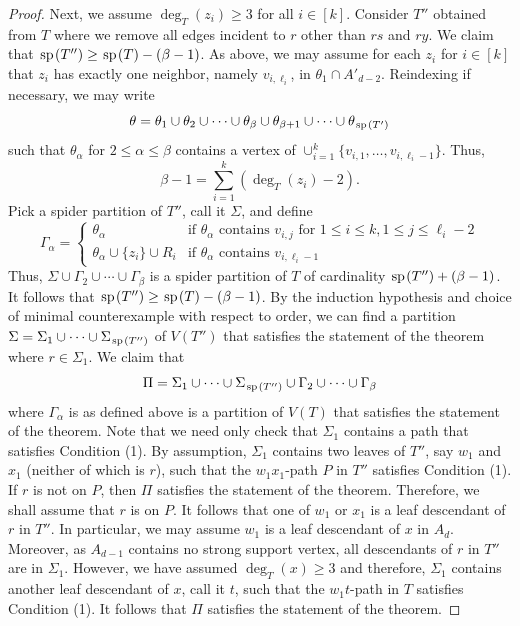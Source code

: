 \documentclass[11pt]{article}
\newcommand{\spider}{\hskip1pt \textrm{sp} \hskip1pt}
\begin{document}
\begin{proof}
Next, we assume $\deg_T(z_i) \ge 3$ for all $i \in [k]$. Consider $T''$ obtained from $T$ where we remove all edges incident to $r$ other than $rs$ and $ry$. We claim that $\spider(T'') \ge \spider(T) - (\beta -1)$. As above, we may assume for each $z_i$ for $i \in [k]$ that $z_i$ has exactly one neighbor, namely $v_{i, \ell_i}$, in $\theta_1 \cap A'_{d-2}$. Reindexing if necessary, we may write 
\[\theta = \theta_1 \cup \theta_2 \cup \cdots \cup \theta_{\beta} \cup \theta_{\beta+1} \cup \cdots \cup \theta_{\spider(T')}\]
such that $\theta_{\alpha}$ for $2 \le \alpha \le \beta$ contains a vertex of $\cup_{i=1}^k \{v_{i,1}, \dots, v_{i,\ell_i-1}\}$. Thus, 
\[\beta-1 = \sum_{i=1}^k (\deg_T(z_i) - 2).\]
Pick a spider partition of $T''$, call it $\Sigma$, and define 
\[\Gamma_{\alpha} = \begin{cases} 
\theta_{\alpha} & \text{if $\theta_{\alpha}$ contains $v_{i,j}$ for $1 \le i \le k, 1\le j \le \ell_i-2$}\\
\theta_{\alpha} \cup \{z_i\} \cup R_{i} & \text{if $\theta_{\alpha}$ contains $v_{i, \ell_i-1}$}
\end{cases}\]
Thus, $\Sigma \cup \Gamma_2 \cup \cdots \cup \Gamma_{\beta}$ is a spider partition of $T$ of cardinality $\spider(T'') + (\beta-1)$. It follows that $\spider(T'') \ge \spider(T) - (\beta-1)$. By the induction hypothesis and choice of minimal counterexample with respect to order, we can find a partition $\Sigma = \Sigma_1 \cup \cdots \cup \Sigma_{\spider(T'')}$ of $V(T'')$ that satisfies the statement of the theorem where $r \in \Sigma_1$. We claim that 
\[\Pi = \Sigma_1\cup \cdots \cup \Sigma_{\spider(T'')} \cup \Gamma_2 \cup \cdots \cup \Gamma_{\beta}\]
where $\Gamma_{\alpha}$ is as defined above is a partition of $V(T)$ that satisfies the statement of the theorem. Note that we need only check that $\Sigma_1$ contains a path that satisfies Condition (1). By assumption, $\Sigma_1$ contains two leaves of $T''$, say $w_1$ and $x_1$ (neither of which is $r$), such that the $w_1x_1$-path $P$ in $T''$ satisfies Condition (1). If $r$ is not on $P$, then $\Pi$ satisfies the statement of the theorem. Therefore, we shall assume that $r$ is on $P$. It follows that one of $w_1$ or $x_1$ is a leaf descendant of $r$ in $T''$. In particular, we may assume $w_1$ is a leaf descendant of $x$ in $A_d$. Moreover, as $A_{d-1}$ contains no strong support vertex, all descendants of $r$ in $T''$ are in $\Sigma_1$. However, we have assumed $\deg_T(x) \ge 3$ and therefore, $\Sigma_1$ contains another leaf descendant of $x$, call it $t$, such that the $w_1t$-path in $T$ satisfies Condition (1). It follows that $\Pi$ satisfies the statement of the theorem. 



\end{proof}
\end{document}
